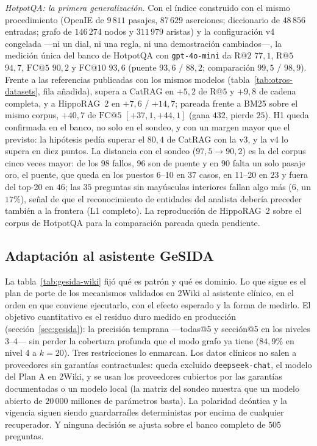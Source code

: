 \documentclass[11pt,a4paper]{article}
\newcommand{\hippo}{HippoRAG~2}
\begin{document}
\emph{HotpotQA: la primera generalización.} Con el índice construido con el
mismo procedimiento (OpenIE de $9\,811$ pasajes, $87\,629$ aserciones;
diccionario de $48\,856$ entradas; grafo de $146\,274$ nodos y $311\,979$
aristas) y la configuración v4 congelada ---ni un dial, ni una regla, ni una
demostración cambiados---, la medición única del banco de HotpotQA con
\texttt{gpt-4o-mini} da $\mathrm{R@}2$ $77{,}1$, $\mathrm{R@}5$ $94{,}7$,
$\mathrm{FC@}5$ $90{,}2$ y $\mathrm{FC@}10$ $93{,}6$ (puente $93{,}6$ /
$88{,}2$; comparación $99{,}5$ / $98{,}9$). Frente a las referencias
publicadas con los mismos modelos (tabla~\ref{tab:otros-datasets}, fila
añadida), supera a CatRAG en $+5{,}2$ de $\mathrm{R@}5$ y $+9{,}8$ de cadena
completa, y a \hippo{} en $+7{,}6$ / $+14{,}7$; pareada frente a BM25 sobre el
mismo corpus, $+40{,}7$ de $\mathrm{FC@}5$ $[+37{,}1,+44{,}1]$ (gana $432$,
pierde $25$). H1 queda confirmada en el banco, no solo en el sondeo, y con un
margen mayor que el previsto: la hipótesis pedía superar el $80{,}4$ de CatRAG
con la v3, y la v4 lo supera en diez puntos. La distancia con el sondeo
($97{,}5 \to 90{,}2$) es la del corpus cinco veces mayor: de los $98$
fallos, $96$ son de puente y en $90$ falta un solo pasaje oro, el puente,
que queda en los puestos 6--10 en $37$ casos, en 11--20 en $23$ y fuera
del top-20 en $46$; las $35$ preguntas sin mayúsculas interiores fallan
algo más ($6$, un $17\%$), señal de que el reconocimiento de entidades del
analista debería preceder también a la frontera (L1 completo). La reproducción de
\hippo{} sobre el corpus de HotpotQA para la comparación pareada queda
pendiente.

\subsection{Adaptación al asistente GeSIDA}
\label{sec:adaptacion-gesida}

La tabla~\ref{tab:gesida-wiki} fijó qué es patrón y qué es dominio. Lo
que sigue es el plan de porte de los mecanismos validados en 2Wiki al
asistente clínico, en el orden en que conviene ejecutarlo, con el efecto
esperado y la forma de medirlo. El objetivo cuantitativo es el residuo
duro medido en producción (sección~\ref{sec:gesida}): la precisión
temprana ---todas@5 y sección@5 en los niveles 3--4--- sin perder la
cobertura profunda que el modo grafo ya tiene ($84{,}9\%$ en nivel 4 a
$k=20$). Tres restricciones lo enmarcan. Los datos clínicos no salen a
proveedores sin garantías contractuales: queda excluido
\texttt{deepseek-chat}, el modelo del Plan A en 2Wiki, y se usan los
proveedores cubiertos por las garantías documentadas o un modelo local
(la matriz del sondeo muestra que un modelo abierto de $20\,000$ millones
de parámetros basta). La polaridad deóntica y la vigencia siguen siendo
guardarraíles deterministas por encima de cualquier recuperador. Y
ninguna decisión se ajusta sobre el banco completo de $505$ preguntas.
\end{document}
